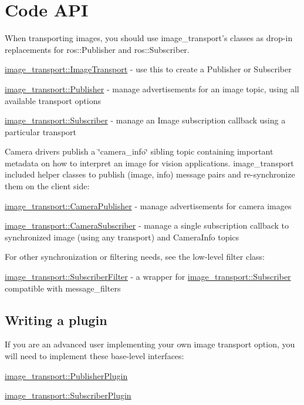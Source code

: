 \hypertarget{index_codeapi}{}\section{Code A\-P\-I}\label{index_codeapi}
When transporting images, you should use image\-\_\-transport's classes as drop-\/in replacements for ros\-::\-Publisher and ros\-::\-Subscriber.
\begin{DoxyItemize}
\item \hyperlink{classimage__transport_1_1_image_transport}{image\-\_\-transport\-::\-Image\-Transport} -\/ use this to create a Publisher or Subscriber
\item \hyperlink{classimage__transport_1_1_publisher}{image\-\_\-transport\-::\-Publisher} -\/ manage advertisements for an image topic, using all available transport options
\item \hyperlink{classimage__transport_1_1_subscriber}{image\-\_\-transport\-::\-Subscriber} -\/ manage an Image subscription callback using a particular transport
\end{DoxyItemize}

Camera drivers publish a \char`\"{}camera\-\_\-info\char`\"{} sibling topic containing important metadata on how to interpret an image for vision applications. image\-\_\-transport included helper classes to publish (image, info) message pairs and re-\/synchronize them on the client side\-:
\begin{DoxyItemize}
\item \hyperlink{classimage__transport_1_1_camera_publisher}{image\-\_\-transport\-::\-Camera\-Publisher} -\/ manage advertisements for camera images
\item \hyperlink{classimage__transport_1_1_camera_subscriber}{image\-\_\-transport\-::\-Camera\-Subscriber} -\/ manage a single subscription callback to synchronized image (using any transport) and Camera\-Info topics
\end{DoxyItemize}

For other synchronization or filtering needs, see the low-\/level filter class\-:
\begin{DoxyItemize}
\item \hyperlink{classimage__transport_1_1_subscriber_filter}{image\-\_\-transport\-::\-Subscriber\-Filter} -\/ a wrapper for \hyperlink{classimage__transport_1_1_subscriber}{image\-\_\-transport\-::\-Subscriber} compatible with message\-\_\-filters
\end{DoxyItemize}\hypertarget{index_writing_plugin}{}\subsection{Writing a plugin}\label{index_writing_plugin}
If you are an advanced user implementing your own image transport option, you will need to implement these base-\/level interfaces\-:
\begin{DoxyItemize}
\item \hyperlink{classimage__transport_1_1_publisher_plugin}{image\-\_\-transport\-::\-Publisher\-Plugin}
\item \hyperlink{classimage__transport_1_1_subscriber_plugin}{image\-\_\-transport\-::\-Subscriber\-Plugin}
\end{DoxyItemize}

